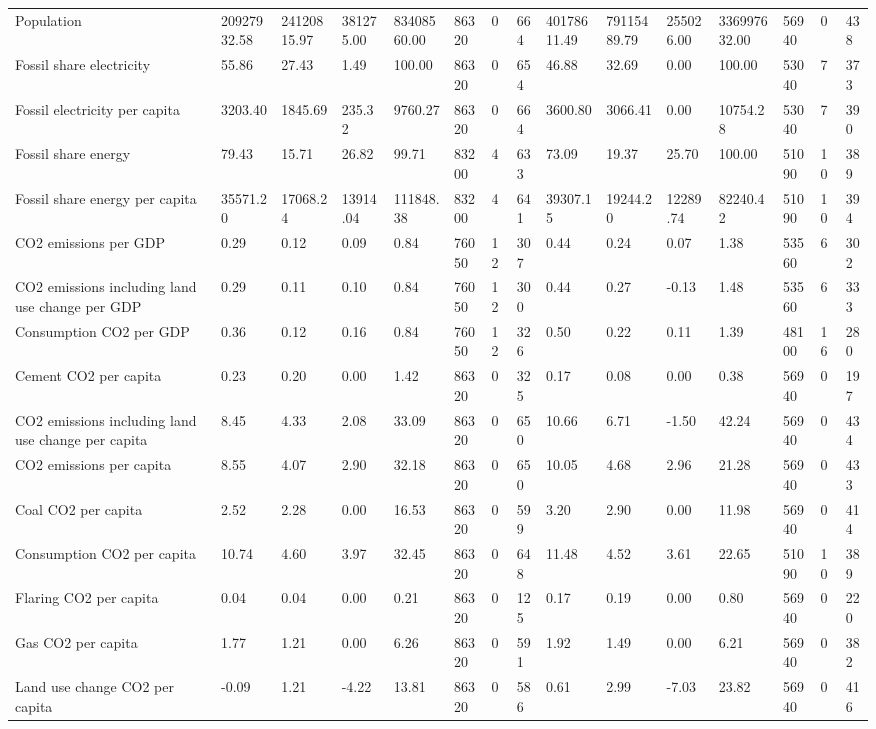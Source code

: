 \begin{longtable}{lllllllllllllll}
Population & 20927932.58 & 24120815.97 & 381275.00 & 83408560.00 & 86320 & 0 & 664 & 40178611.49 & 79115489.79 & 255026.00 & 336997632.00 & 56940 & 0 & 438\\
Fossil share electricity & 55.86 & 27.43 & 1.49 & 100.00 & 86320 & 0 & 654 & 46.88 & 32.69 & 0.00 & 100.00 & 53040 & 7 & 373\\
\addlinespace
Fossil electricity per capita & 3203.40 & 1845.69 & 235.32 & 9760.27 & 86320 & 0 & 664 & 3600.80 & 3066.41 & 0.00 & 10754.28 & 53040 & 7 & 390\\
Fossil share energy & 79.43 & 15.71 & 26.82 & 99.71 & 83200 & 4 & 633 & 73.09 & 19.37 & 25.70 & 100.00 & 51090 & 10 & 389\\
Fossil share energy per capita & 35571.20 & 17068.24 & 13914.04 & 111848.38 & 83200 & 4 & 641 & 39307.15 & 19244.20 & 12289.74 & 82240.42 & 51090 & 10 & 394\\
CO2 emissions per GDP & 0.29 & 0.12 & 0.09 & 0.84 & 76050 & 12 & 307 & 0.44 & 0.24 & 0.07 & 1.38 & 53560 & 6 & 302\\
CO2 emissions including land use change per GDP & 0.29 & 0.11 & 0.10 & 0.84 & 76050 & 12 & 300 & 0.44 & 0.27 & -0.13 & 1.48 & 53560 & 6 & 333\\
\addlinespace
Consumption CO2 per GDP & 0.36 & 0.12 & 0.16 & 0.84 & 76050 & 12 & 326 & 0.50 & 0.22 & 0.11 & 1.39 & 48100 & 16 & 280\\
Cement CO2 per capita & 0.23 & 0.20 & 0.00 & 1.42 & 86320 & 0 & 325 & 0.17 & 0.08 & 0.00 & 0.38 & 56940 & 0 & 197\\
CO2 emissions including land use change per capita & 8.45 & 4.33 & 2.08 & 33.09 & 86320 & 0 & 650 & 10.66 & 6.71 & -1.50 & 42.24 & 56940 & 0 & 434\\
CO2 emissions per capita & 8.55 & 4.07 & 2.90 & 32.18 & 86320 & 0 & 650 & 10.05 & 4.68 & 2.96 & 21.28 & 56940 & 0 & 433\\
Coal CO2 per capita & 2.52 & 2.28 & 0.00 & 16.53 & 86320 & 0 & 599 & 3.20 & 2.90 & 0.00 & 11.98 & 56940 & 0 & 414\\
\addlinespace
Consumption CO2 per capita & 10.74 & 4.60 & 3.97 & 32.45 & 86320 & 0 & 648 & 11.48 & 4.52 & 3.61 & 22.65 & 51090 & 10 & 389\\
Flaring CO2 per capita & 0.04 & 0.04 & 0.00 & 0.21 & 86320 & 0 & 125 & 0.17 & 0.19 & 0.00 & 0.80 & 56940 & 0 & 220\\
Gas CO2 per capita & 1.77 & 1.21 & 0.00 & 6.26 & 86320 & 0 & 591 & 1.92 & 1.49 & 0.00 & 6.21 & 56940 & 0 & 382\\
Land use change CO2 per capita & -0.09 & 1.21 & -4.22 & 13.81 & 86320 & 0 & 586 & 0.61 & 2.99 & -7.03 & 23.82 & 56940 & 0 & 416\\

\end{longtable}
